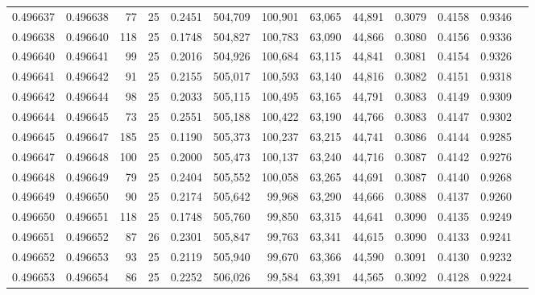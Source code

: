 \begin{tabular}{rrrrrrrrrrrrr}
0.496637 & 0.496638 &    77 &  25 &                                     0.2451 & 504,709 & 100,901 &  63,065 &  44,891 & 0.3079 & 0.4158 & 0.9346 \\
0.496638 & 0.496640 &   118 &  25 &                                     0.1748 & 504,827 & 100,783 &  63,090 &  44,866 & 0.3080 & 0.4156 & 0.9336 \\
0.496640 & 0.496641 &    99 &  25 &                                     0.2016 & 504,926 & 100,684 &  63,115 &  44,841 & 0.3081 & 0.4154 & 0.9326 \\
0.496641 & 0.496642 &    91 &  25 &                                     0.2155 & 505,017 & 100,593 &  63,140 &  44,816 & 0.3082 & 0.4151 & 0.9318 \\
0.496642 & 0.496644 &    98 &  25 &                                     0.2033 & 505,115 & 100,495 &  63,165 &  44,791 & 0.3083 & 0.4149 & 0.9309 \\
0.496644 & 0.496645 &    73 &  25 &                                     0.2551 & 505,188 & 100,422 &  63,190 &  44,766 & 0.3083 & 0.4147 & 0.9302 \\
0.496645 & 0.496647 &   185 &  25 &                                     0.1190 & 505,373 & 100,237 &  63,215 &  44,741 & 0.3086 & 0.4144 & 0.9285 \\
0.496647 & 0.496648 &   100 &  25 &                                     0.2000 & 505,473 & 100,137 &  63,240 &  44,716 & 0.3087 & 0.4142 & 0.9276 \\
0.496648 & 0.496649 &    79 &  25 &                                     0.2404 & 505,552 & 100,058 &  63,265 &  44,691 & 0.3087 & 0.4140 & 0.9268 \\
0.496649 & 0.496650 &    90 &  25 &                                     0.2174 & 505,642 &  99,968 &  63,290 &  44,666 & 0.3088 & 0.4137 & 0.9260 \\
0.496650 & 0.496651 &   118 &  25 &                                     0.1748 & 505,760 &  99,850 &  63,315 &  44,641 & 0.3090 & 0.4135 & 0.9249 \\
0.496651 & 0.496652 &    87 &  26 &                                     0.2301 & 505,847 &  99,763 &  63,341 &  44,615 & 0.3090 & 0.4133 & 0.9241 \\
0.496652 & 0.496653 &    93 &  25 &                                     0.2119 & 505,940 &  99,670 &  63,366 &  44,590 & 0.3091 & 0.4130 & 0.9232 \\
0.496653 & 0.496654 &    86 &  25 &                                     0.2252 & 506,026 &  99,584 &  63,391 &  44,565 & 0.3092 & 0.4128 & 0.9224 \\

\end{tabular}
